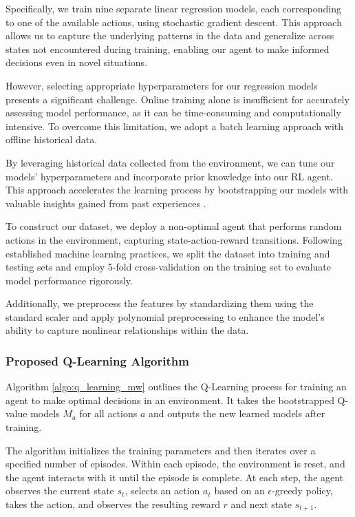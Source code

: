 Specifically, we train nine separate linear regression models, each corresponding to one of the available actions, using stochastic gradient descent. This approach allows us to capture the underlying patterns in the data and generalize across states not encountered during training, enabling our agent to make informed decisions even in novel situations.

However, selecting appropriate hyperparameters for our regression models presents a significant challenge. Online training alone is insufficient for accurately assessing model performance, as it can be time-consuming and computationally intensive. To overcome this limitation, we adopt a batch learning approach with offline historical data.

By leveraging historical data collected from the environment, we can tune our models' hyperparameters and incorporate prior knowledge into our RL agent. This approach accelerates the learning process by bootstrapping our models with valuable insights gained from past experiences \cite{cano2017curator,vukosi2015improved}.

To construct our dataset, we deploy a non-optimal agent that performs random actions in the environment, capturing state-action-reward transitions. Following established machine learning practices, we split the dataset into training and testing sets and employ 5-fold cross-validation on the training set to evaluate model performance rigorously.

Additionally, we preprocess the features by standardizing them using the standard scaler and apply polynomial preprocessing to enhance the model's ability to capture nonlinear relationships within the data.


\subsubsection{Proposed Q-Learning Algorithm}

Algorithm \ref{algo:q_learning_mw} outlines the Q-Learning process for training an agent to make optimal decisions in an environment. It takes the bootstrapped Q-value models $M_a$ for all actions $a$ and outputs the new learned models after training.

The algorithm initializes the training parameters and then iterates over a specified number of episodes. Within each episode, the environment is reset, and the agent interacts with it until the episode is complete. At each step, the agent observes the current state $s_t$, selects an action $a_t$ based on an $\epsilon$-greedy policy, takes the action, and observes the resulting reward $r$ and next state $s_{t+1}$.


